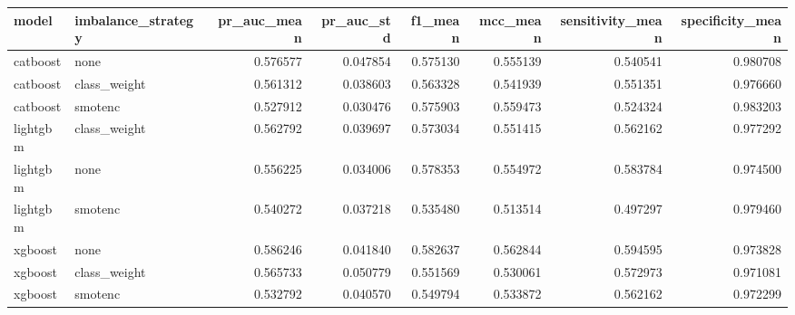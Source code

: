 \begin{tabular}{llrrrrrr}
\toprule
model & imbalance\_strategy & pr\_auc\_mean & pr\_auc\_std & f1\_mean & mcc\_mean & sensitivity\_mean & specificity\_mean \\
\midrule
catboost & none & 0.576577 & 0.047854 & 0.575130 & 0.555139 & 0.540541 & 0.980708 \\
catboost & class\_weight & 0.561312 & 0.038603 & 0.563328 & 0.541939 & 0.551351 & 0.976660 \\
catboost & smotenc & 0.527912 & 0.030476 & 0.575903 & 0.559473 & 0.524324 & 0.983203 \\
lightgbm & class\_weight & 0.562792 & 0.039697 & 0.573034 & 0.551415 & 0.562162 & 0.977292 \\
lightgbm & none & 0.556225 & 0.034006 & 0.578353 & 0.554972 & 0.583784 & 0.974500 \\
lightgbm & smotenc & 0.540272 & 0.037218 & 0.535480 & 0.513514 & 0.497297 & 0.979460 \\
xgboost & none & 0.586246 & 0.041840 & 0.582637 & 0.562844 & 0.594595 & 0.973828 \\
xgboost & class\_weight & 0.565733 & 0.050779 & 0.551569 & 0.530061 & 0.572973 & 0.971081 \\
xgboost & smotenc & 0.532792 & 0.040570 & 0.549794 & 0.533872 & 0.562162 & 0.972299 \\
\bottomrule
\end{tabular}
